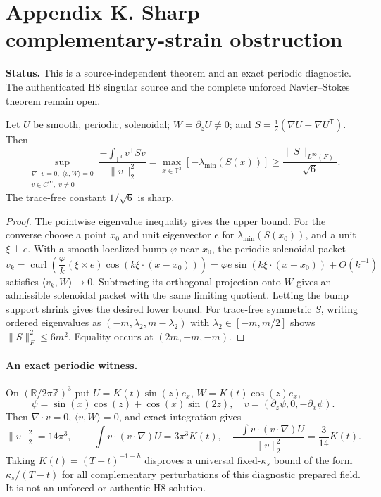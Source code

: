 \clearpage
\section*{Appendix K. Sharp complementary-strain obstruction}
\noindent\textbf{Status.} This is a source-independent theorem and an exact periodic diagnostic. The authenticated H8 singular source and the complete unforced Navier--Stokes theorem remain open.

\begin{theorem}
Let $U$ be smooth, periodic, solenoidal; $W=\partial_zU\neq0$; and $S=\tfrac12(\nabla U+\nabla U^{\mathsf T})$. Then
\[
\boxed{\sup_{\substack{\nabla\cdot v=0,\;\langle v,W\rangle=0\\v\in C^\infty,\;v\ne0}}
\frac{-\int_{\mathbb T^3}v^{\mathsf T}Sv}{\|v\|_2^2}
=\max_{x\in\mathbb T^3}[-\lambda_{\min}(S(x))]
\ge \frac{\|S\|_{L^\infty(F)}}{\sqrt6}.}
\]
The trace-free constant $1/\sqrt6$ is sharp.
\end{theorem}
\begin{proof}
The pointwise eigenvalue inequality gives the upper bound. For the converse choose a point $x_0$ and unit eigenvector $e$ for $\lambda_{\min}(S(x_0))$, and a unit $\xi\perp e$. With a smooth localized bump $\varphi$ near $x_0$, the periodic solenoidal packet
\[
v_k=\operatorname{curl}\left(\frac{\varphi}k(\xi\times e)
\cos(k\xi\cdot(x-x_0))\right)
=\varphi e\sin(k\xi\cdot(x-x_0))+O(k^{-1})
\]
satisfies $\langle v_k,W\rangle\to0$. Subtracting its orthogonal projection onto $W$ gives an admissible solenoidal packet with the same limiting quotient. Letting the bump support shrink gives the desired lower bound. For trace-free symmetric $S$, writing ordered eigenvalues as $(-m,\lambda_2,m-\lambda_2)$ with $\lambda_2\in[-m,m/2]$ shows $\|S\|_F^2\le6m^2$. Equality occurs at $(2m,-m,-m)$.
\end{proof}

\paragraph{An exact periodic witness.}
On $(\mathbb R/2\pi\mathbb Z)^3$ put $U=K(t)\sin(z)e_x$, $W=K(t)\cos(z)e_x$,
\[
\psi=\sin(x)\cos(z)+\cos(x)\sin(2z),\quad
v=(\partial_z\psi,0,-\partial_x\psi).
\]
Then $\nabla\cdot v=0$, $\langle v,W\rangle=0$, and exact integration gives
\[
\boxed{\|v\|_2^2=14\pi^3,\quad
-\int v\cdot(v\cdot\nabla)U=3\pi^3K(t),\quad
\frac{-\int v\cdot(v\cdot\nabla)U}{\|v\|_2^2}
=\frac3{14}K(t).}
\]
Taking $K(t)=(T-t)^{-1-h}$ disproves a universal fixed-$\kappa_s$ bound of the form $\kappa_s/(T-t)$ for all complementary perturbations of this diagnostic prepared field. It is not an unforced or authentic H8 solution.

